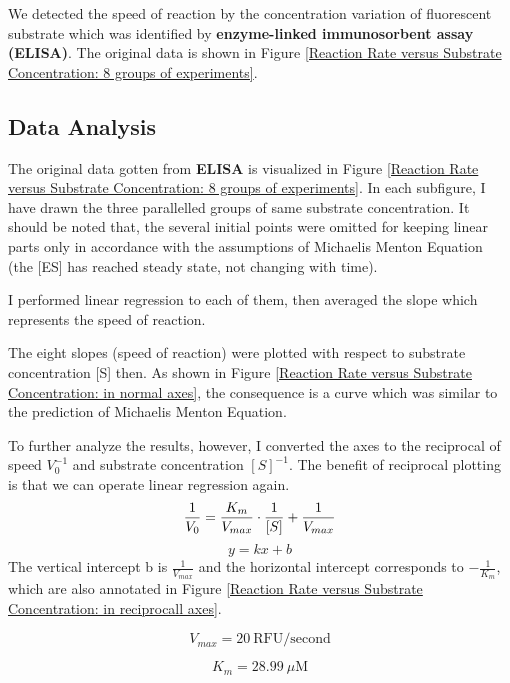 \documentclass{report}
\begin{document}
We detected the speed of reaction by the concentration variation of fluorescent substrate which was identified by \textbf{enzyme-linked immunosorbent assay (ELISA)}.
The original data is shown in Figure \ref{Reaction Rate versus Substrate Concentration: 8 groups of experiments}.


\subsection{Data Analysis}

The original data gotten from \textbf{ELISA} is visualized in Figure \ref{Reaction Rate versus Substrate Concentration: 8 groups of experiments}.
In each subfigure, I have drawn the three parallelled groups of same substrate concentration.
It should be noted that, the several initial points were omitted for keeping linear parts only in accordance with the assumptions of Michaelis Menton Equation (the [ES] has reached steady state, not changing with time).

I performed linear regression to each of them, then averaged the slope which represents the speed of reaction.

The eight slopes (speed of reaction) were plotted with respect to substrate concentration [S] then.
As shown in Figure \ref{Reaction Rate versus Substrate Concentration: in normal axes}, the consequence is a curve which was similar to the prediction of Michaelis Menton Equation.

To further analyze the results, however, I converted the axes to the reciprocal of speed $V_0^{-1}$ and substrate concentration $[S]^{-1}$.
The benefit of reciprocal plotting is that we can operate linear regression again.
$$
\frac{1}{V_0}=\frac{K_m}{V_{max}}\cdot \frac{1}{[S]}+\frac{1}{V_{max}}\\
$$
$$
y=kx+b
$$
The vertical intercept b is $\frac{1}{V_{max}}$ and the horizontal intercept corresponds to $-\frac{1}{K_m}$, which are also annotated in Figure \ref{Reaction Rate versus Substrate Concentration: in reciprocall axes}.

$$
V_{max}=20 \ \text{RFU/second}
$$

$$
K_{m}=28.99 \ \mu \text{M}
$$
\end{document}
